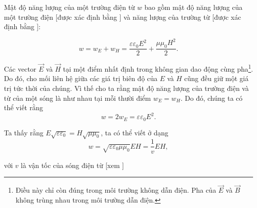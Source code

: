 Mật độ năng lượng của một trường điện từ $w$ bao gồm mật độ năng lượng của một trường điện [được xác định bằng ] và năng lượng của trường từ [được xác định bằng ]:

\begin{equation}\label{eq:15_26}
    w = w_E + w_H = \frac{\varepsilon\varepsilon_0 E^2}{2} + \frac{\mu\mu_0 H^2}{2}.
\end{equation}

\noindent

Các vector $\vec{E}$ và $\vec{H}$ tại một điểm nhất định trong không gian dao động cùng pha\footnote{Điều này chỉ còn đúng trong môi trường không dẫn điện. Pha của $\vec{E}$ và $\vec{B}$ không trùng nhau trong môi trường dẫn điện.}.
Do đó,  cho mối liên hệ giữa các giá trị biên độ của $E$ và $H$ cũng đều giữ một giá trị tức thời của chúng. 
Vì thế cho ta rằng mật độ năng lượng của trường điện và từ của một sóng là như nhau tại mỗi thười điểm $w_E=w_H$. Do đó, chúng ta có thể viết rằng
\begin{equation}\label{eq:15_27}
    w = 2 w_E = \varepsilon\varepsilon_0 E^2.
\end{equation}


Ta thấy  rằng $E\sqrt{\varepsilon\varepsilon_0} = H \sqrt{\mu\mu_0}$, ta có thể viết  ở dạng
\begin{equation*}
    w = \sqrt{\varepsilon\varepsilon_0\mu\mu_0} EH = \frac{1}{v} EH,
\end{equation*}

\noindent

với $v$ là vận tốc của sóng điện từ [xem ]


